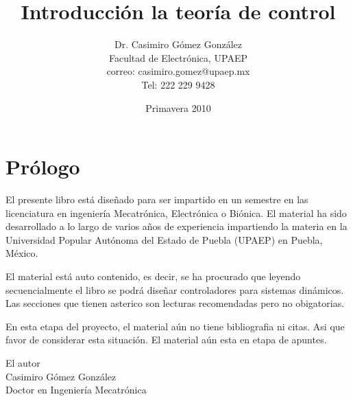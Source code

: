 \documentclass[12pt]{book}
\title{Introducción la teoría de control}
\author{Dr. Casimiro Gómez González\\
	Facultad de Electrónica, UPAEP\\
               correo: casimiro.gomez@upaep.mx\\
               Tel: 222 229 9428}
\date{Primavera 2010}
\theoremstyle{definition}
\theoremstyle{remark}
\theoremstyle{plain}
\begin{document}
\frontmatter
\maketitle


\chapter{Prólogo}

El presente libro está diseñado para ser impartido en un semestre en las licenciatura en ingeniería Mecatrónica, Electrónica o Biónica. El material ha sido desarrollado a lo largo de varios años de experiencia impartiendo la materia en la Universidad Popular Autónoma del Estado de Puebla (UPAEP) en Puebla, México.

El material está auto contenido, es decir, se ha procurado que leyendo secuencialmente el libro se podrá diseñar controladores para sistemas dinámicos. Las secciones que tienen asterico son lecturas recomendadas pero no obigatorias.

En esta etapa del proyecto, el material aún no tiene bibliografia ni citas. Asi que favor de considerar esta situación. El material aún esta en etapa de apuntes.


\begin{flushright}

El autor\\
Casimiro Gómez González\\
Doctor en Ingeniería Mecatrónica
\end{flushright}

\tableofcontents

\mainmatter
\end{document}
